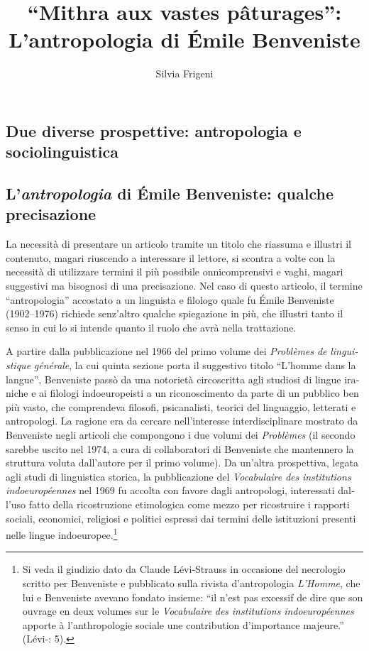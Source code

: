 \documentclass[output=paper]{../langscibook}
\author{Silvia Frigeni\affiliation{Sapienza Università di Roma, Université Sorbonne Nouvelle -- Paris 3}\orcid{}}
\title{“Mithra aux vastes pâturages”: L’antropologia di Émile Benveniste}
\begin{document}
\begin{otherlanguage}{italian}
\maketitle

\section{Due diverse prospettive: antropologia e sociolinguistica} 

\subsection{L’\textit{antropologia} di Émile Benveniste: qualche precisazione}

La necessità di presentare un articolo tramite un titolo che riassuma e illustri il contenuto, magari riuscendo a interessare il lettore, si scontra a volte con la necessità di utilizzare termini il più possibile onnicomprensivi e vaghi, magari suggestivi ma bisognosi di una precisazione. Nel caso di questo articolo, il termine “antropologia” accostato a un linguista e filologo quale fu Émile Benveniste (1902--1976) richiede senz’altro qualche spiegazione in più, che illustri tanto il senso in cui lo si intende quanto il ruolo che avrà nella trattazione. 

A partire dalla pubblicazione nel 1966 del primo volume dei \textit{Problèmes} \textit{de} \textit{linguistique} \textit{générale}, la cui quinta sezione porta il suggestivo titolo “L’homme dans la langue”, Benveniste passò da una notorietà circoscritta agli studiosi di lingue iraniche e ai filologi indoeuropeisti a un riconoscimento da parte di un pubblico ben più vasto, che comprendeva filosofi, psicanalisti, teorici del linguaggio, letterati e antropologi. La ragione era da cercare nell’interesse interdisciplinare mostrato da Benveniste negli articoli che compongono i due volumi dei \textit{Problèmes} (il secondo sarebbe uscito nel 1974, a cura di collaboratori di Benveniste che mantennero la struttura voluta dall’autore per il primo volume). Da un’altra prospettiva, legata agli studi di linguistica storica, la pubblicazione del \textit{Vocabulaire} \textit{des} \textit{institutions} \textit{indoeuropéennes} nel 1969 fu accolta con favore dagli antropologi, interessati dall’uso fatto della ricostruzione etimologica come mezzo per ricostruire i rapporti sociali, economici, religiosi e politici espressi dai termini delle istituzioni presenti nelle lingue indoeuropee.\footnote{ \textrm{Si veda il giudizio dato da Claude Lévi-Strauss in occasione del necrologio scritto per Benveniste e pubblicato sulla rivista d'antropologia} \textrm{\textit{L’Homme}}\textrm{, che lui e Benveniste avevano fondato insieme:} \textrm{“}\textrm{il n’est pas excessif de dire que son ouvrage en deux volumes sur le} \textrm{\textit{Vocabulaire} \textit{des} \textit{institutions} \textit{indoeuropéennes}} \textrm{apporte à l’anthropologie sociale une contribution d’importance majeure.}\textrm{”} \textrm{(Lévi-\citealt{Strauss1976}: 5).}}


\end{otherlanguage}
\end{document}
